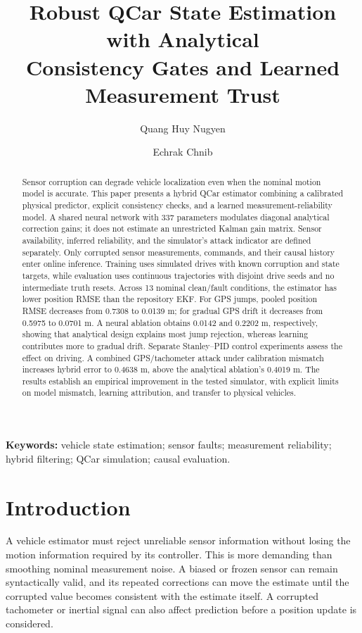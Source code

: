 ﻿\documentclass[10pt,a4paper]{article}
\title{\vspace{-1.1em}Robust QCar State Estimation with Analytical\\
Consistency Gates and Learned Measurement Trust}
\author{Quang Huy Nugyen \and Echrak Chnib}
\date{}
\begin{document}
\maketitle
\vspace{-1.4em}
\begin{abstract}
Sensor corruption can degrade vehicle localization even when the nominal motion model is accurate.
This paper presents a hybrid QCar estimator combining a calibrated physical predictor,
explicit consistency checks, and a learned measurement-reliability model.
A shared neural network with 337 parameters modulates diagonal analytical correction gains;
it does not estimate an unrestricted Kalman gain matrix.
Sensor availability, inferred reliability, and the simulator's attack indicator are defined separately.
Only corrupted sensor measurements, commands, and their causal history enter online inference.
Training uses simulated drives with known corruption and state targets, while evaluation uses
continuous trajectories with disjoint drive seeds and no intermediate truth resets.
Across 13 nominal clean/fault conditions, the estimator has lower position RMSE than
the repository EKF. For GPS jumps, pooled position RMSE decreases from 0.7308 to 0.0139 m;
for gradual GPS drift it decreases from 0.5975 to 0.0701 m.
A neural ablation obtains 0.0142 and 0.2202 m, respectively, showing that analytical
design explains most jump rejection, whereas learning contributes more to gradual drift.
Separate Stanley--PID control experiments assess the effect on driving.
A combined GPS/tachometer attack under calibration mismatch increases hybrid error to
0.4638 m, above the analytical ablation's 0.4019 m.
The results establish an empirical improvement in the tested simulator, with explicit
limits on model mismatch, learning attribution, and transfer to physical vehicles.
\end{abstract}
\noindent\textbf{Keywords:} vehicle state estimation; sensor faults; measurement reliability;
hybrid filtering; QCar simulation; causal evaluation.

\section{Introduction}
A vehicle estimator must reject unreliable sensor information without losing the motion
information required by its controller. This is more demanding than smoothing nominal
measurement noise. A biased or frozen sensor can remain syntactically valid, and its
repeated corrections can move the estimate until the corrupted value becomes consistent
with the estimate itself. A corrupted tachometer or inertial signal can also affect
prediction before a position update is considered.
\end{document}
